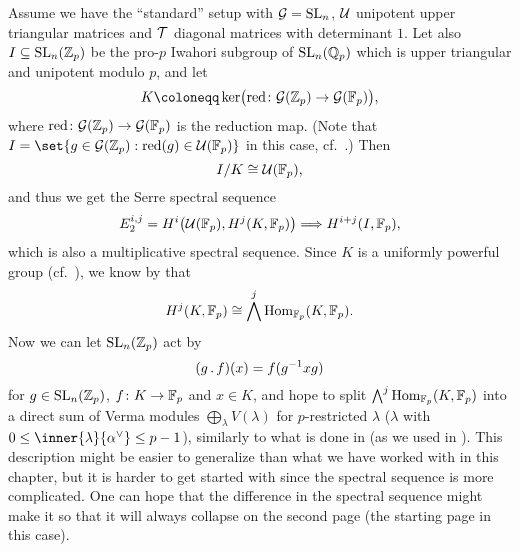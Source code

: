 Assume we have the \enquote{standard} setup with $\mathcal{G} = \operatorname{SL}_{n}$, $\mathcal{U}$ unipotent upper triangular matrices and $\mathcal{T}$ diagonal matrices with determinant $1$. Let also $I \subseteq \operatorname{SL}_{n}(\mathbb{Z}_{p})$ be the pro-$p$ Iwahori subgroup of $\operatorname{SL}_{n}(\mathbb{Q}_{p})$ which is upper triangular and unipotent modulo $p$, and let
\begin{equation*}
  K \coloneqq \kernel\bigl( \red \colon \gs{G}(\Z_{p}) \to \gs{G}(\F_{p}) \bigr),
\end{equation*}
where $\operatorname{red} \colon \mathcal{G}(\mathbb{Z}_{p}) \to \mathcal{G}(\mathbb{F}_{p})$ is the reduction map. (Note that $I = \set{g \in \gs{G}(\Z_{p}) : \red(g) \in \gs{U}(\F_{p})}$ in this case, cf.\ \cite{Generators}.) Then
\begin{equation*}
  I/K \cong \mathcal{U}(\mathbb{F}_{p}),
\end{equation*}
and thus we get the Serre spectral sequence
\begin{equation*}
  E_{2}^{i,j} = H^{i}\bigl( \mathcal{U}(\mathbb{F}_{p}), H^{j}(K,\mathbb{F}_{p}) \bigr) \Longrightarrow H^{i+j}(I,\mathbb{F}_{p}),
\end{equation*}
which is also a multiplicative spectral sequence. Since $K$ is a uniformly powerful group (cf.\ \cite[Prop.~7.6]{SchOll-modular}), we know by \cite[p.~183]{Laz} that
\begin{equation*}
  H^{j}(K,\mathbb{F}_{p}) \cong \bigwedge^{j} \operatorname{Hom}_{\mathbb{F}_{p}}(K,\mathbb{F}_{p}).
\end{equation*}
Now we can let $\operatorname{SL}_{n}(\mathbb{Z}_{p})$ act by
\begin{equation*}
  (g \,.\, f)(x) = f(g^{-1}xg)
\end{equation*}
for $g \in \operatorname{SL}_{n}(\mathbb{Z}_{p})$, $f \colon K \to \mathbb{F}_{p}$ and $x \in K$, and hope to split $\bigwedge^{j} \operatorname{Hom}_{\mathbb{F}_{p}}(K,\mathbb{F}_{p})$ into a direct sum of Verma modules $\bigoplus_{\lambda} V(\lambda)$ for $p$-restricted $\lambda$ ($\lambda$ with $0 \leq \inner{\lambda}{\alpha^{\vee}} \leq p-1$), similarly to what is done in \cite{PT} (as we used in ). This description might be easier to generalize than what we have worked with in this chapter, but it is harder to get started with since the spectral sequence is more complicated. One can hope that the difference in the spectral sequence might make it so that it will always collapse on the second page (the starting page in this case).



